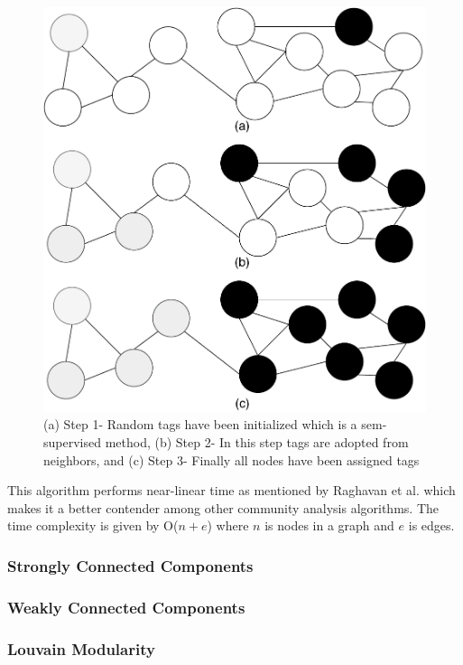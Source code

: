 \documentclass[journal,twoside,web]{ieeecolor}
\begin{document}
\begin{figure}[!h]
    \centerline{\includegraphics[scale=0.35]{figures/label_propagation.pdf}}
    \caption{(a) Step 1- Random tags have been initialized which is a sem-supervised method, (b) Step 2- In this step tags are adopted from neighbors, and (c) Step 3- Finally all nodes have been assigned tags}
    \label{fig6}
\end{figure}

This algorithm performs near-linear time as mentioned by Raghavan et al.\cite{16} which makes it a better contender among other community analysis algorithms. The time complexity is given by O($n + e$) where $n$ is nodes in a graph and $e$ is edges.

\subsubsection{Strongly Connected Components}
\subsubsection{Weakly Connected Components}
\subsubsection{Louvain Modularity}
\end{document}
